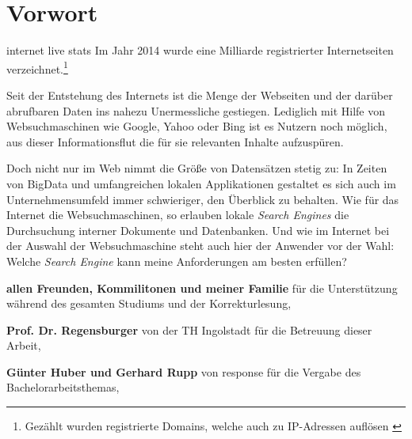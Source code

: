 \chapter*{Vorwort}

\begin{chapquote}{internet live stats \cite{InternetLiveStats.2014}}
	Im Jahr 2014 wurde eine Milliarde registrierter Internetseiten verzeichnet.\footnote{Gezählt wurden registrierte Domains, welche auch zu IP-Adressen auflösen \cite{InternetLiveStats.2014}}
\end{chapquote}

\vspace*{2\baselineskip}

Seit der Entstehung des Internets ist die Menge der Webseiten und der darüber abrufbaren Daten ins nahezu Unermessliche gestiegen. Lediglich mit Hilfe von Websuchmaschinen wie Google, Yahoo oder Bing ist es Nutzern noch möglich, aus dieser Informationsflut die für sie relevanten Inhalte aufzuspüren.

Doch nicht nur im Web nimmt die Größe von Datensätzen stetig zu: In Zeiten von BigData und umfangreichen lokalen Applikationen gestaltet es sich auch im Unternehmens\-umfeld immer schwieriger, den Überblick zu behalten. Wie für das Internet die Websuchmaschinen, so erlauben lokale \emph{Search Engines} die Durchsuchung interner Dokumente und Datenbanken. Und wie im Internet bei der Auswahl der Websuchmaschine steht auch hier der Anwender vor der Wahl: Welche \emph{Search Engine} kann meine Anforderungen am besten erfüllen?

\vspace*{3\baselineskip}
\noindent
{\normalfont\Large\sffamily  {}}
\vspace*{2\baselineskip}

\noindent
\textbf{allen Freunden, Kommilitonen und meiner Familie} für die Unterstützung während des gesamten Studiums und der Korrekturlesung,
\vspace*{5pt}

\noindent
\textbf{Prof. Dr. Regensburger} von der TH Ingolstadt für die Betreuung dieser Arbeit,
\vspace*{5pt}

\noindent
\textbf{Günter Huber und Gerhard Rupp} von response für die Vergabe des Bachelorarbeitsthemas,
\vspace*{5pt}

